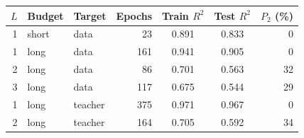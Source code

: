 \begin{tabular}{@{}rllrccr@{}}
\toprule
$L$ & Budget & Target & Epochs & Train $R^2$ & Test $R^2$ & $P_2$ (\%) \\
\midrule
1 & short & data & 23 & 0.891 & 0.833 & 0 \\
1 & long & data & 161 & 0.941 & 0.905 & 0 \\
2 & long & data & 86 & 0.701 & 0.563 & 32 \\
3 & long & data & 117 & 0.675 & 0.544 & 29 \\
1 & long & teacher & 375 & 0.971 & 0.967 & 0 \\
2 & long & teacher & 164 & 0.705 & 0.592 & 34 \\
\bottomrule
\end{tabular}
